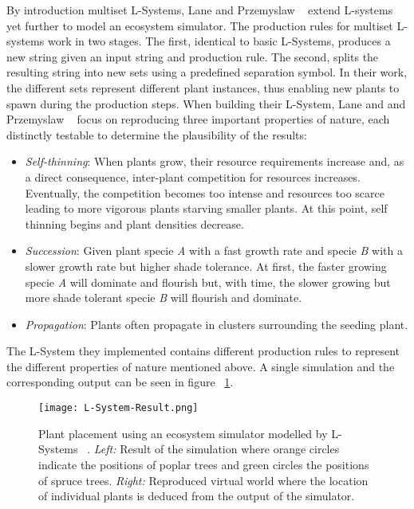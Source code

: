 By introduction multiset L-Systems, Lane and Przemyslaw ~\cite{Lane2002} extend L-systems yet further to model an ecosystem simulator. The production rules for multiset L-systems work in two stages. The first, identical to basic L-Systems, produces a new string given an input string and production rule. The second, splits the resulting string into new sets using a predefined separation symbol. In their work, the different sets represent different plant instances, thus enabling new plants to spawn during the production steps. When building their L-System, Lane and and Przemyslaw ~\cite{Lane2002} focus on reproducing three important properties of nature, each distinctly testable to determine the plausibility of the results:
\begin{itemize}
\item \textit{Self-thinning}: When plants grow, their resource requirements increase and, as a direct consequence, inter-plant competition for resources increases. Eventually, the competition becomes too intense and resources too scarce leading to more vigorous plants starving smaller plants. At this point, self thinning begins and plant densities decrease.
\item \textit{Succession}: Given plant specie \textit{A} with a fast growth rate and specie \textit{B} with a slower growth rate but higher shade tolerance. At first, the faster growing specie \textit{A} will dominate and flourish but, with time, the slower growing but more shade tolerant specie \textit{B} will flourish and dominate.
\item \textit{Propagation}: Plants often propagate in clusters surrounding the seeding plant.
\end{itemize}

The L-System they implemented contains different production rules to represent the different properties of nature mentioned above. A single simulation and the corresponding output can be seen in figure ~\ref{Plant placement using an ecosystem simulator modelled by L-System}.

\begin{figure}[h]
  \centering
    \label{Plant placement using an ecosystem simulator modelled by L-System}
    \texttt{[image: L-System-Result.png]}
    \caption[Plant placement using an ecosystem simulator modelled by L-Systems]{ Plant placement using an ecosystem simulator modelled by L-Systems ~\cite{Lane2002}. \textit{Left:} Result of the simulation where orange circles indicate the positions of poplar trees and green circles the positions of spruce trees. \textit{Right:} Reproduced virtual world where the location of individual plants is deduced from the output of the simulator.}
\end{figure}

